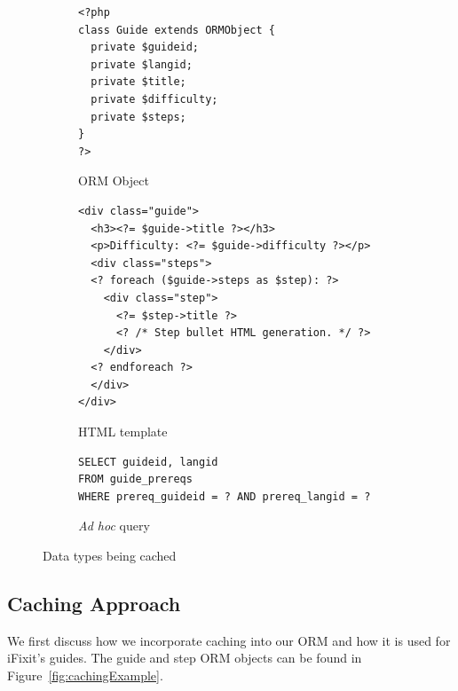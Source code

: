 \documentclass[12pt]{ucthesis}
\begin{document}
\begin{figure}[hbtp]
\begin{subfigure}[b]{1.0\textwidth}
\begin{ssp}
\begin{verbatim}
<?php
class Guide extends ORMObject {
  private $guideid;
  private $langid;
  private $title;
  private $difficulty;
  private $steps;
}
?>
\end{verbatim}
\caption{ORM Object}
\label{fig:ormObject}
\end{ssp}
\end{subfigure}

\vspace{2em}
\begin{subfigure}[b]{1.0\textwidth}
\begin{ssp}
\begin{verbatim}
<div class="guide">
  <h3><?= $guide->title ?></h3>
  <p>Difficulty: <?= $guide->difficulty ?></p>
  <div class="steps">
  <? foreach ($guide->steps as $step): ?>
    <div class="step">
      <?= $step->title ?>
      <? /* Step bullet HTML generation. */ ?>
    </div>
  <? endforeach ?>
  </div>
</div>
\end{verbatim}
\caption{HTML template}
\label{fig:htmlTemplate}
\end{ssp}
\end{subfigure}

\vspace{2em}
\begin{subfigure}[b]{1.0\textwidth}
\begin{ssp}
\begin{verbatim}
SELECT guideid, langid
FROM guide_prereqs
WHERE prereq_guideid = ? AND prereq_langid = ?
\end{verbatim}
\caption{\textit{Ad hoc} query}
\label{fig:adHocQuery}
\end{ssp}
\end{subfigure}

\caption{Data types being cached}
\label{fig:dataBeingCached}
\end{figure}

\subsection{Caching Approach}
We first discuss how we incorporate caching into our ORM and how it is used for \textsf{iFixit}'s guides.
The guide and step ORM objects can be found in Figure~\ref{fig:cachingExample}.
\end{document}
